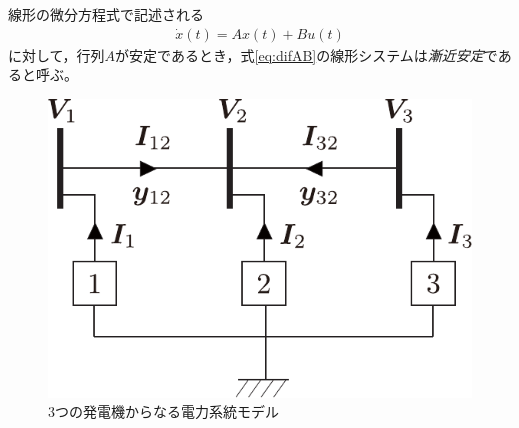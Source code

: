 \documentclass[tombow,dvipdfmx]{corona-a5}
\begin{document}
\begin{定義}[線形システムの漸近安定性]
\label{def:difsta}
線形の微分方程式で記述される
\begin{align}\label{eq:difAB}
\dot{x}(t)=Ax(t) +Bu(t)
\end{align}
に対して，行列$A$が安定であるとき，式\ref{eq:difAB}の線形システムは\emph{漸近安定}であると呼ぶ。
\end{定義}

\begin{figure}[t]
\centering
\includegraphics[width = .30\linewidth]{figs/3busex}
\caption{3つの発電機からなる電力系統モデル}
\label{fig:3genex}
\end{figure}
\end{document}
